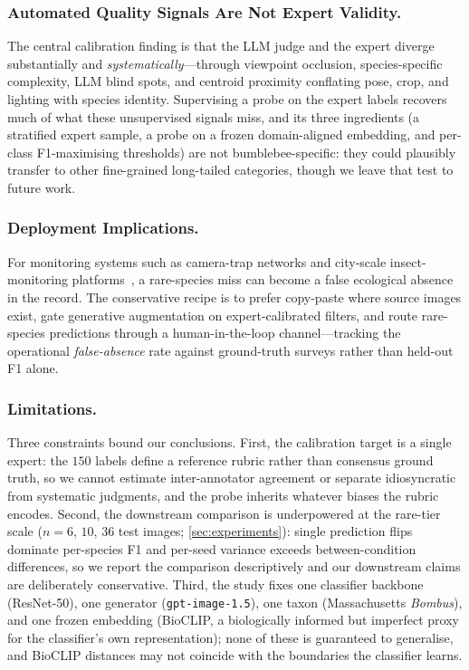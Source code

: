 \documentclass[runningheads]{llncs}
\begin{document}
\subsubsection{Automated Quality Signals Are Not Expert Validity.}
The central calibration finding is that the LLM judge and the expert
diverge substantially and \emph{systematically}---through viewpoint
occlusion, species-specific complexity, LLM blind spots, and centroid
proximity conflating pose, crop, and lighting with species identity.
Supervising a probe on the expert labels recovers much of what these
unsupervised signals miss, and its three ingredients (a stratified
expert sample, a probe on a frozen domain-aligned embedding, and
per-class F1-maximising thresholds) are not bumblebee-specific: they
could plausibly transfer to other fine-grained long-tailed categories,
though we leave that test to future work.

\subsubsection{Deployment Implications.}
For monitoring systems such as camera-trap networks and city-scale
insect-monitoring platforms~\cite{venverloo_towards_2024}, a
rare-species miss can become a false ecological absence in the record. The conservative recipe is to
prefer copy-paste where source images exist, gate generative
augmentation on expert-calibrated filters, and route rare-species
predictions through a human-in-the-loop channel---tracking the
operational \emph{false-absence} rate against ground-truth surveys
rather than held-out F1 alone.

\subsubsection{Limitations.}
Three constraints bound our conclusions. First, the calibration target
is a single expert: the $150$ labels define a reference rubric rather
than consensus ground truth, so we cannot estimate inter-annotator
agreement or separate idiosyncratic from systematic judgments, and the
probe inherits whatever biases the rubric encodes. Second, the
downstream comparison is underpowered at the rare-tier scale
($n{=}6$, $10$, $36$ test images; \cref{sec:experiments}): single
prediction flips dominate per-species F1 and per-seed variance exceeds
between-condition differences, so we report the comparison descriptively
and our downstream claims are deliberately conservative. Third, the study fixes one classifier
backbone (ResNet-50), one generator (\texttt{gpt-image-1.5}), one taxon
(Massachusetts \emph{Bombus}), and one frozen embedding (BioCLIP, a
biologically informed but imperfect proxy for the classifier's own
representation); none of these is guaranteed to generalise, and BioCLIP
distances may not coincide with the boundaries the classifier learns.
\end{document}
